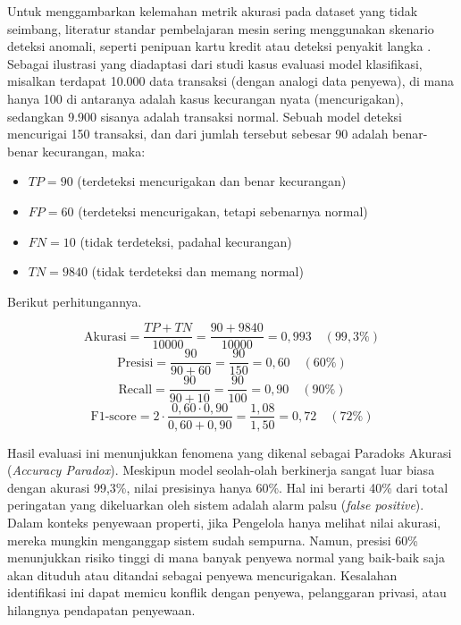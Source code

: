     

    Untuk menggambarkan kelemahan metrik akurasi pada dataset yang tidak seimbang, literatur standar pembelajaran mesin sering menggunakan skenario deteksi anomali, seperti penipuan kartu kredit atau deteksi penyakit langka \cite{provost2013data}. Sebagai ilustrasi yang diadaptasi dari studi kasus evaluasi model klasifikasi, misalkan terdapat 10.000 data transaksi (dengan analogi data penyewa), di mana hanya 100 di antaranya adalah kasus kecurangan nyata (mencurigakan), sedangkan 9.900 sisanya adalah transaksi normal. Sebuah model deteksi mencurigai 150 transaksi, dan dari jumlah tersebut sebesar 90 adalah benar-benar kecurangan, maka:
    
    \begin{itemize}
        \item $TP = 90$ (terdeteksi mencurigakan dan benar kecurangan)
        \item $FP = 60$ (terdeteksi mencurigakan, tetapi sebenarnya normal)
        \item $FN = 10$ (tidak terdeteksi, padahal kecurangan)
        \item $TN = 9840$ (tidak terdeteksi dan memang normal)
    \end{itemize}
            
    Berikut perhitungannya.
            
    \[
    \text{Akurasi} = \frac{TP + TN}{10000} = \frac{90 + 9840}{10000} = 0{,}993 \quad (99{,}3\%)
    \]
    \[
    \text{Presisi} = \frac{90}{90 + 60} = \frac{90}{150} = 0{,}60 \quad (60\%)
    \]
    \[
    \text{Recall} = \frac{90}{90 + 10} = \frac{90}{100} = 0{,}90 \quad (90\%)
    \]
    \[
    \text{F1-score} = 2 \cdot \frac{0{,}60 \cdot 0{,}90}{0{,}60 + 0{,}90} = \frac{1{,}08}{1{,}50} = 0{,}72 \quad (72\%)
    \]
            
    Hasil evaluasi ini menunjukkan fenomena yang dikenal sebagai Paradoks Akurasi (\textit{Accuracy Paradox}). Meskipun model seolah-olah berkinerja sangat luar biasa dengan akurasi 99,3\%, nilai presisinya hanya 60\%. Hal ini berarti 40\% dari total peringatan yang dikeluarkan oleh sistem adalah alarm palsu (\textit{false positive}). Dalam konteks penyewaan properti, jika Pengelola hanya melihat nilai akurasi, mereka mungkin menganggap sistem sudah sempurna. Namun, presisi 60\% menunjukkan risiko tinggi di mana banyak penyewa normal yang baik-baik saja akan dituduh atau ditandai sebagai penyewa mencurigakan. Kesalahan identifikasi ini dapat memicu konflik dengan penyewa, pelanggaran privasi, atau hilangnya pendapatan penyewaan. 
    
